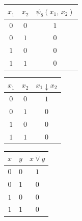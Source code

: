 \documentclass[12pt,a4paper]{article}
\theoremstyle{plain}
\theoremstyle{definition}
\theoremstyle{remark}
\numberwithin{equation}{section}
\begin{document}
\begin{figure}[H]
  \begin{minipage}[t]{0.27\textwidth}
    \vspace{0em}
    \begin{tabularx}{\linewidth}{|C|C|C C|}
      \hline
      $x_1$ & $x_2$ &  \\
      \hline
      $0$ & $0$ &  \\
      $0$ & $1$ &  \\
      $1$ & $0$ &  \\
      $1$ & $1$ &  \\
      \hline
    \end{tabularx}
  \end{minipage} \hfill
  \begin{minipage}[t]{0.05\textwidth}
    \hspace{0em}
    \vspace{3em}

    \resizebox{\textwidth}{\textwidth}{$=$}
  \end{minipage} \hfill
  \begin{minipage}[t]{0.27\textwidth}
    \vspace{0em}
    \begin{tabularx}{\linewidth}{|C|C|C C|}
      \hline
      $x_1$ & $x_2$ &  \\
      \hline
      $0$ & $0$ &  \\
      $0$ & $1$ &  \\
      $1$ & $0$ &  \\
      $1$ & $1$ &  \\
      \hline
    \end{tabularx}
  \end{minipage} \hfill
  \begin{minipage}[t]{0.05\textwidth}
    \hspace{0em}
    \vspace{2.5em}

    \resizebox{\textwidth}{\textwidth}{$\equiv$}
  \end{minipage} \hfill
  \begin{minipage}[t]{0.27\textwidth}
    \vspace{0em}
    \begin{tabularx}{\linewidth}{|C|C|C C|}
      \hline
      $x$ & $y$ &  \\
      \hline
      $0$ & $0$ &  \\
      $0$ & $1$ &  \\
      $1$ & $0$ &  \\
      $1$ & $1$ &  \\
      \hline
    \end{tabularx}
  \end{minipage}
\end{figure}
\end{document}
